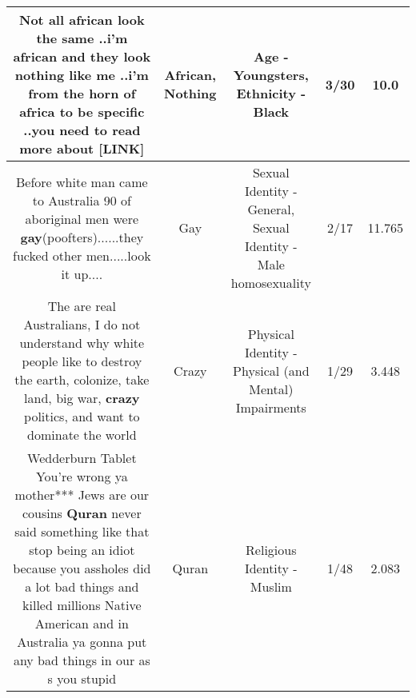 \documentclass[11pt]{article}
\newlength\mylength
\begin{document}
\begin{center}
\begin{longtable}{|C{.65\mylength}|C{.30\mylength}|C{.12\mylength}|C{.12\mylength}|C{.12\mylength}|}
  \small Not all \textbf{african} look the same ..i'm \textbf{african} and they look \textbf{nothing} like me ..i'm from the horn of africa to be specific ..you need to read more about  [LINK] \normalsize   & African, Nothing & Age - Youngsters, Ethnicity - Black & 3/30 & 10.0 \\  \hline
  \small Before white man came to Australia 90 of aboriginal men were \textbf{g\textbf{ay}}(poofters)......they fucked other men.....look it up....\normalsize   & Gay & Sexual Identity - General, Sexual Identity - Male homosexuality & 2/17 & 11.765 \\  \hline
  \small The are real Australians, I do not understand why white people like to destroy the earth, colonize, take land, big war, \textbf{crazy} politics, and want to dominate the world\normalsize   & Crazy & Physical Identity - Physical (and Mental) Impairments & 1/29 & 3.448 \\  \hline
  \small Wedderburn Tablet You're wrong ya mother*** Jews are our cousins \textbf{Quran} never said something like that stop being an idiot because you assholes did a lot bad things and killed millions Native American and in Australia ya gonna put any bad things in our as s you stupid\normalsize   & Quran & Religious Identity - Muslim & 1/48 & 2.083 \\  \hline

\end{longtable}
\end{center}
\end{document}

